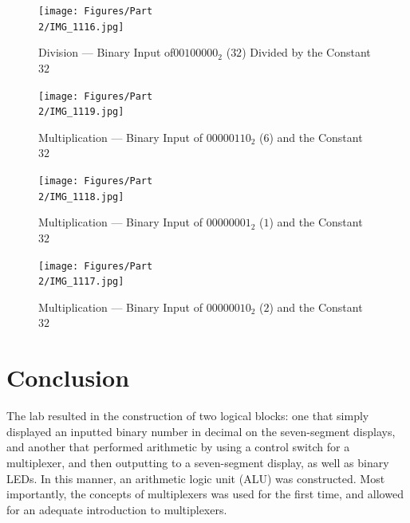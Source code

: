 \documentclass[
	letterpaper, %
	10pt, %
]{CSUniSchoolLabReport}
\begin{document}
\begin{figure}[H]
  \centering
  \texttt{[image: Figures/Part\\ 2/IMG\_1116.jpg]}
  \caption{Division — Binary Input of$ 00100000_2$ ($32$) Divided by the Constant $32$}
  \label{fig:15}
\end{figure}

\begin{figure}[H]
  \centering
  \texttt{[image: Figures/Part\\ 2/IMG\_1119.jpg]}
  \caption{Multiplication — Binary Input of $00000110_2$ ($6$) and the Constant $32$}
  \label{fig:16}
\end{figure}

\begin{figure}[H]
  \centering
  \texttt{[image: Figures/Part\\ 2/IMG\_1118.jpg]}
  \caption{Multiplication —  Binary Input of $00000001_2$ ($1$) and the Constant $32$}
  \label{fig:17}
\end{figure}

\begin{figure}[H]
  \centering
  \texttt{[image: Figures/Part\\ 2/IMG\_1117.jpg]}
  \caption{Multiplication — Binary Input of $00000010_2$ ($2$) and the Constant $32$}
  \label{fig:18}
\end{figure}

\section{Conclusion}

\hspace{.5 in} The lab resulted in the construction of two logical blocks: one that simply displayed an inputted binary number in decimal on the seven-segment displays, and another that performed arithmetic by using a control switch for a multiplexer, and then outputting to a seven-segment display, as well as binary LEDs. In this manner, an arithmetic logic unit (ALU) was constructed. Most importantly, the concepts of multiplexers was used for the first time, and allowed for an adequate introduction to multiplexers.
\end{document}
